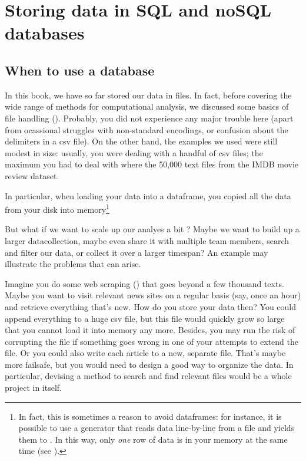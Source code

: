 \section{Storing data in SQL and noSQL databases}
\label{sec:databases}

\subsection{When to use a database}
In this book, we have so far stored our data in files. In fact, before
covering the wide range of methods for computational analysis, we
discussed some basics of file handling
(). Probably, you did not experience any major
trouble here (apart from ocassional struggles with non-standard
encodings, or confusion about the delimiters in a csv file). On the
other hand, the examples we used were still modest in size: usually,
you were dealing with a handful of csv files; the maximum you had to
deal with where the 50,000 text files from the IMDB movie review
dataset.

In particular, when loading your data into a dataframe, you copied all
the data from your disk into memory\footnote{In fact, this is
  sometimes a reason to avoid dataframes: for instance, it is possible
  to use a generator that reads data line-by-line from a file and
  yields them to . In this way, only \emph{one} row
  of data is in your memory at the same time (see ).}

But what if we want to scale up our analyes a bit
\cite[see][]{Trilling2018b}? Maybe we want to build up a larger
datacollection, maybe even share it with multiple team members, search
and filter our data, or collect it over a larger timespan? An
example may illustrate the problems that can arise.

Imagine you do some web scraping () that goes beyond
a few thousand texts. Maybe you want to visit relevant news sites on a
regular basis (say, once an hour) and retrieve everything that's
new. How do you store your data then? You could append everything to a
huge csv file, but this file would quickly grow so large that you
cannot load it into memory any more. Besides, you may run the risk of
corrupting the file if something goes wrong in one of your attempts to
extend the file. Or you could also write each article to a new, separate file.
That's maybe more failsafe, but you would need to design a good way
to organize the data. In particular, devising a method to search
and find relevant files would be a whole project in itself.

